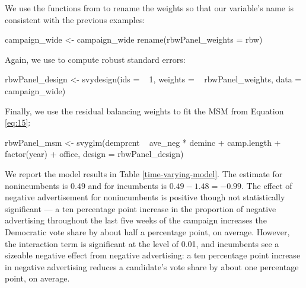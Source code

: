 \begin{Schunk}
\end{Schunk}

We use the functions from  to rename the weights so that
our variable's name is consistent with the previous examples:

\begin{Schunk}
\begin{Sinput}
campaign_wide <- campaign_wide %>%
  rename(rbwPanel_weights = rbw)
\end{Sinput}
\end{Schunk}

Again, we use  to compute robust standard
errors:

\begin{Schunk}
\begin{Sinput}
rbwPanel_design <- svydesign(ids = ~ 1,
                             weights = ~ rbwPanel_weights,
                             data = campaign_wide)
\end{Sinput}
\end{Schunk}

Finally, we use the residual balancing weights to fit the MSM from
Equation \ref{eq:15}:

\begin{Schunk}
\begin{Sinput}
rbwPanel_msm <- svyglm(demprcnt ~ ave_neg * deminc + camp.length +
                         factor(year) + office,
                       design = rbwPanel_design)
\end{Sinput}
\end{Schunk}

We report the model results in Table \ref{time-varying-model}. The
estimate for nonincumbents is \(0.49\) and for incumbents is
\(0.49-1.48=-0.99\). The effect of negative advertisement for
nonincumbents is positive though not statistically significant --- a ten
percentage point increase in the proportion of negative advertising
throughout the last five weeks of the campaign increases the Democratic
vote share by about half a percentage point, on average. However, the
interaction term is significant at the level of 0.01, and incumbents see
a sizeable negative effect from negative advertising: a ten percentage
point increase in negative advertising reduces a candidate's vote share
by about one percentage point, on average.

